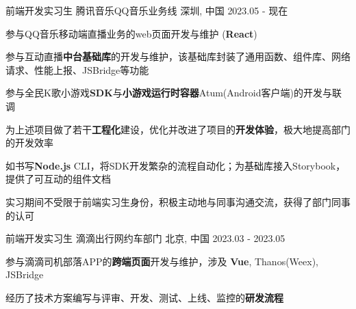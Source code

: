 

\begin{cventries}
    \cventry
    {前端开发实习生} %
    {腾讯音乐\hspace{2mm}QQ音乐业务线} %
    {深圳, 中国} %
    {2023.05 - 现在} %
    {
        \begin{cvitems} %
            \item {参与QQ音乐移动端直播业务的web页面开发与维护 (\textbf{React})}
            \item {参与互动直播\textbf{中台基础库}的开发与维护，该基础库封装了通用函数、组件库、网络请求、性能上报、JSBridge等功能}
            \item {参与全民K歌小游戏\textbf{SDK}与\textbf{小游戏运行时容器}Atum(Android客户端)的开发与联调}
            \item {为上述项目做了若干\textbf{工程化}建设，优化并改进了项目的\textbf{开发体验}，极大地提高部门的开发效率}
            \item {如书写\textbf{Node.js} CLI，将SDK开发繁杂的流程自动化；为基础库接入Storybook，提供了可互动的组件文档}
            \item {实习期间不受限于前端实习生身份，积极主动地与同事沟通交流，获得了部门同事的认可}
        \end{cvitems}
    }

    \cventry
    {前端开发实习生} %
    {滴滴出行\hspace{2mm}网约车部门} %
    {北京, 中国} %
    {2023.03 - 2023.05} %
    {
        \begin{cvitems} %
            \item {参与滴滴司机部落APP的\textbf{跨端页面}开发与维护，涉及 \textbf{Vue}, Thanos(Weex), JSBridge }
            \item {经历了技术方案编写与评审、开发、测试、上线、监控的\textbf{研发流程}}
        \end{cvitems}
    }
\end{cventries}
